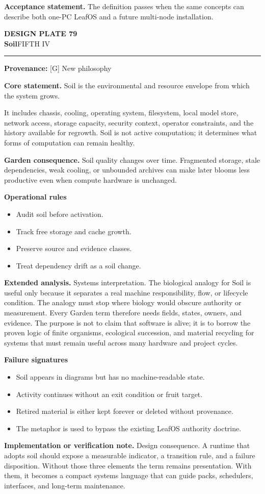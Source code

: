 \documentclass[10pt,letterpaper,oneside]{article}
\newcommand{\prov}[1]{\textcolor{gardenBlue}{\sffamily\footnotesize\textbf{Provenance:} #1}}
\newcommand{\platetitle}[3]{%
  \begin{minipage}[t][0.54in][t]{\textwidth}
  {\sffamily\bfseries\color{gardenDeep}\fontsize{9}{10}\selectfont DESIGN PLATE #1}\\[-1pt]
  {\sffamily\bfseries\color{gardenInk}\fontsize{16.5}{18}\selectfont #2}\hfill{\sffamily\color{gardenGreen}\large #3}
  \end{minipage}\vspace{-2pt}\hrule\vspace{5pt}}
\begin{document}
\begin{acceptbox}
\textbf{Acceptance statement.} The definition passes when the same concepts can describe both one-PC LeafOS and a future multi-node installation.
\end{acceptbox}
\newpage
\platetitle{79}{Soil}{FIFTH IV}
\prov{[G] New philosophy}
\fontsize{8.85}{10.45}\selectfont
\begin{corebox}
\textbf{Core statement.} Soil is the environmental and resource envelope from which the system grows.
\end{corebox}
It includes chassis, cooling, operating system, filesystem, local model store, network access, storage capacity, security context, operator constraints, and the history available for regrowth. Soil is not active computation; it determines what forms of computation can remain healthy.

\textbf{Garden consequence.} Soil quality changes over time. Fragmented storage, stale dependencies, weak cooling, or unbounded archives can make later blooms less productive even when compute hardware is unchanged.

\textbf{Operational rules}
\begin{itemize}
\item Audit soil before activation.
\item Track free storage and cache growth.
\item Preserve source and evidence classes.
\item Treat dependency drift as a soil change.
\end{itemize}
\textbf{Extended analysis.} Systems interpretation. The biological analogy for Soil is useful only because it separates a real machine responsibility, flow, or lifecycle condition. The analogy must stop where biology would obscure authority or measurement. Every Garden term therefore needs fields, states, owners, and evidence. The purpose is not to claim that software is alive; it is to borrow the proven logic of finite organisms, ecological succession, and material recycling for systems that must remain useful across many hardware and project cycles.

\textbf{Failure signatures}
\begin{itemize}
\item Soil appears in diagrams but has no machine-readable state.
\item Activity continues without an exit condition or fruit target.
\item Retired material is either kept forever or deleted without provenance.
\item The metaphor is used to bypass the existing LeafOS authority doctrine.
\end{itemize}
\textbf{Implementation or verification note.} Design consequence. A runtime that adopts soil should expose a measurable indicator, a transition rule, and a failure disposition. Without those three elements the term remains presentation. With them, it becomes a compact systems language that can guide packs, schedulers, interfaces, and long-term maintenance.
\end{document}
